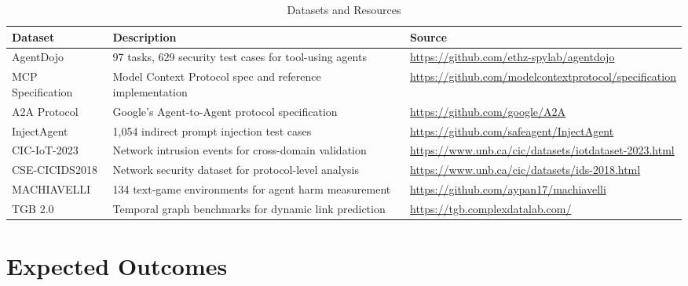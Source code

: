 \documentclass[12pt,a4paper]{article}
\begin{document}
\begin{table}[H]
\centering
\caption{Datasets and Resources}
\begin{tabularx}{\textwidth}{@{}lXl@{}}
\toprule
\textbf{Dataset} & \textbf{Description} & \textbf{Source} \\
\midrule
AgentDojo & 97 tasks, 629 security test cases for tool-using agents & \url{https://github.com/ethz-spylab/agentdojo} \\
\addlinespace
MCP Specification & Model Context Protocol spec and reference implementation & \url{https://github.com/modelcontextprotocol/specification} \\
\addlinespace
A2A Protocol & Google's Agent-to-Agent protocol specification & \url{https://github.com/google/A2A} \\
\addlinespace
InjectAgent & 1,054 indirect prompt injection test cases & \url{https://github.com/safeagent/InjectAgent} \\
\addlinespace
CIC-IoT-2023 & Network intrusion events for cross-domain validation & \url{https://www.unb.ca/cic/datasets/iotdataset-2023.html} \\
\addlinespace
CSE-CICIDS2018 & Network security dataset for protocol-level analysis & \url{https://www.unb.ca/cic/datasets/ids-2018.html} \\
\addlinespace
MACHIAVELLI & 134 text-game environments for agent harm measurement & \url{https://github.com/aypan17/machiavelli} \\
\addlinespace
TGB 2.0 & Temporal graph benchmarks for dynamic link prediction & \url{https://tgb.complexdatalab.com/} \\
\bottomrule
\end{tabularx}
\end{table}

\section{Expected Outcomes}
\end{document}
